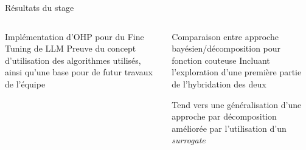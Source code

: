 \begin{frame}{Résultats du stage}
    \begin{columns}
        \begin{column}{0.45\textwidth}
            \begin{block}{Implémentation d'OHP pour du Fine Tuning de LLM}
                Preuve du concept d'utilisation des algorithmes utilisés, ainsi qu'une base pour de futur travaux de l'équipe
                
            \end{block}
        \end{column}
        \begin{column}{0.45\textwidth}
            \begin{block}{Comparaison entre approche bayésien/décomposition pour fonction couteuse}
                Incluant l'exploration d'une première partie de l'hybridation des deux

                Tend vers une généralisation d'une approche par décomposition améliorée par l'utilisation d'un \textit{surrogate}
            \end{block}
            
        \end{column}
    \end{columns}
\end{frame}

